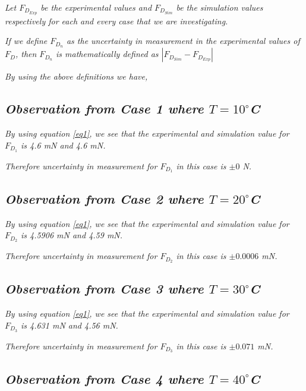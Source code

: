 \textit{Let $F_{{D}_{Exp}}$ be the experimental values and $F_{{D}_{Sim}}$ be the simulation values respectively for each and every case that we are investigating.} 

\textit{If we define $F_{D_n}$ as the uncertainty in measurement in the experimental values of $F_D$, then $F_{D_n}$ is mathematically defined as $\left| F_{{D}_{Sim}} - F_{{D}_{Exp}} \right|$}

\textit{By using the above definitions we have,}

\subsection{\textit{Observation from Case 1 where $T = 10^\circ$C}}

	\textit{By using equation \ref{eq1}, we see that the experimental and simulation value for $F_{D_1}$ is 4.6 mN and 4.6 mN.}
        
	\textit{Therefore uncertainty in measurement for $F_{D_1}$ in this case is $\pm{\textit{0}}$ N.}        
        
\subsection{\textit{Observation from Case 2 where $T = 20^\circ$C}}

	\textit{By using equation \ref{eq1}, we see that the experimental and simulation value for $F_{D_2}$ is 4.5906 mN and 4.59 mN.}
        
	\textit{Therefore uncertainty in measurement for $F_{D_2}$ in this case is $\pm{\textit{0.0006}}$ mN.}        
        
\subsection{\textit{Observation from Case 3 where $T = 30^\circ$C}}

	\textit{By using equation \ref{eq1}, we see that the experimental and simulation value for $F_{D_3}$ is 4.631 mN and 4.56 mN.}
        
	\textit{Therefore uncertainty in measurement for $F_{D_3}$ in this case is $\pm{\textit{0.071}}$ mN.}        
        
\subsection{\textit{Observation from Case 4 where $T = 40^\circ$C}}
        
